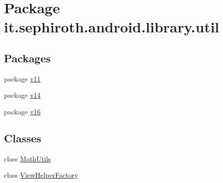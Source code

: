 \hypertarget{namespaceit_1_1sephiroth_1_1android_1_1library_1_1util}{}\section{Package it.\+sephiroth.\+android.\+library.\+util}
\label{namespaceit_1_1sephiroth_1_1android_1_1library_1_1util}
\subsection*{Packages}
\begin{DoxyCompactItemize}
\item 
package \hyperlink{namespaceit_1_1sephiroth_1_1android_1_1library_1_1util_1_1v11}{v11}
\item 
package \hyperlink{namespaceit_1_1sephiroth_1_1android_1_1library_1_1util_1_1v14}{v14}
\item 
package \hyperlink{namespaceit_1_1sephiroth_1_1android_1_1library_1_1util_1_1v16}{v16}
\end{DoxyCompactItemize}
\subsection*{Classes}
\begin{DoxyCompactItemize}
\item 
class \hyperlink{classit_1_1sephiroth_1_1android_1_1library_1_1util_1_1_math_utils}{Math\+Utils}
\item 
class \hyperlink{classit_1_1sephiroth_1_1android_1_1library_1_1util_1_1_view_helper_factory}{View\+Helper\+Factory}
\end{DoxyCompactItemize}
